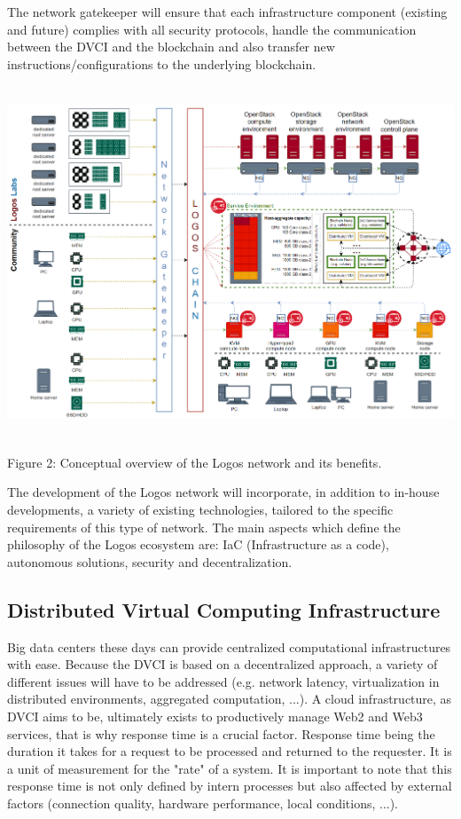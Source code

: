 \documentclass[]{article}
\begin{document}
The network gatekeeper will ensure that each infrastructure component (existing and future) complies with all security protocols, handle the communication between the DVCI and the blockchain and also transfer new instructions/configurations to the underlying blockchain.

\begin{center}
	\includegraphics[height=10.5cm]{logos-network}
\end{center}
\begin{center}
	Figure 2: Conceptual overview of the Logos network and its benefits.
\end{center}

The development of the Logos network will incorporate, in addition to in-house developments, a variety of existing technologies, tailored to the specific requirements of this type of network.
The main aspects which define the philosophy of the Logos ecosystem are: IaC (Infrastructure as a code), autonomous solutions, security and decentralization.

\subsection{Distributed Virtual Computing Infrastructure}
Big data centers these days can provide centralized computational infrastructures with ease.
Because the DVCI is based on a decentralized approach, a variety of different issues will have to be addressed (e.g. network latency, virtualization in distributed environments, aggregated computation, ...).
A cloud infrastructure, as DVCI aims to be, ultimately exists to productively manage Web2 and Web3 services, that is why response time is a crucial factor. 
Response time being the duration it takes for a request to be processed and returned to the requester.
It is a unit of measurement for the "rate" of a system. 
It is important to note that this response time is not only defined by intern processes but also affected by external factors (connection quality, hardware performance, local conditions, ...).
\end{document}
